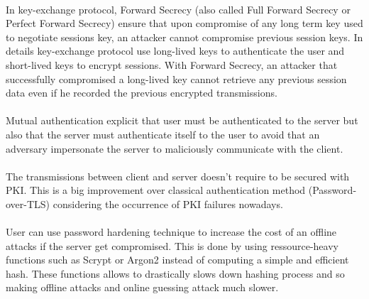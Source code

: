 \documentclass[../report.tex]{subfiles}
\begin{document}
\paragraph{}
In key-exchange protocol, Forward Secrecy (also called Full Forward Secrecy or Perfect Forward Secrecy) ensure that upon compromise of any long term key used to negotiate sessions key, an attacker cannot compromise previous session keys.
In details key-exchange protocol use long-lived keys to authenticate the user and short-lived keys to encrypt sessions. With Forward Secrecy, an attacker that successfully compromised a long-lived key cannot retrieve any previous session data even if he recorded the previous encrypted transmissions. %

\paragraph{}
Mutual authentication explicit that user must be authenticated to the server but also that the server must authenticate itself to the user to avoid that an adversary impersonate the server to maliciously communicate with the client.

\paragraph{}
The transmissions between client and server doesn't require to be secured with PKI. This is a big improvement over classical authentication method (Password-over-TLS) considering the occurrence of PKI failures nowadays. %

\paragraph{}
User can use password hardening technique to increase the cost of an offline attacks if the server get compromised. This is done by using ressource-heavy functions such as Scrypt \cite{Scrypt_Paper} or Argon2 \cite{Argon2_Paper} instead of computing a simple and efficient hash. These functions allows to drastically slows down hashing process and so making offline attacks and online guessing attack much slower.
\end{document}
